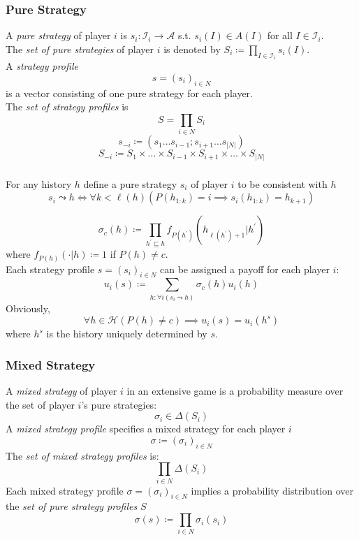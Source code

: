 \documentclass[UTF8,11pt,colorlinks,compress,openany]{beamer}%
\begin{document}
\begin{frame}\frametitle{Pure Strategy}
\begin{definition}
	A \emph{pure strategy} of player $i$ is $s_i: \mathcal{I}_i\to \mathcal{A}$ s.t. $s_i(I)\in A(I)$ for all $I\in\mathcal{I}_i$.\\
	The \emph{set of pure strategies} of player $i$ is denoted by $S_i\coloneqq \prod\limits_{I\in\mathcal{I}_i}s_i(I)$.\\
	A \emph{strategy profile} \[s=(s_i)_{i\in N}\] is a vector consisting of one pure strategy for each player.\\
	The \emph{set of strategy profiles} is \[S=\prod\limits_{i\in N} S_i\]
	\[s_{-i}\coloneqq (s_1\ldots s_{i-1};s_{i+1}\ldots s_{|N|})\]
	\[S_{-i}\coloneqq S_1\times\ldots\times S_{i-1}\times S_{i+1}\times\ldots\times S_{|N|}\]
\end{definition}
\end{frame}

\begin{frame}\frametitle{}
\begin{definition}
	For any history $h$ define a pure strategy $s_i$ of player $i$ to be consistent with $h$
	\[s_i\leadsto h\iff\forall k<\ell(h)\left(P(h_{1:k})=i\implies s_i(h_{1:k})=h_{k+1}\right)\]
\end{definition}
\[\sigma_c(h)\coloneqq \prod\limits_{h^\prime\sqsubseteq h}f_{P(h^\prime)}(h_{\ell(h^\prime)+1}|h^\prime)\]
where $f_{P(h)}(\cdot|h)\coloneqq 1$ if $P(h)\neq c$.\\
Each strategy profile $s=(s_i)_{i\in N}$ can be assigned a payoff for each player $i$:
\[u_i(s)\coloneqq \sum\limits_{h: \forall i(s_i\leadsto h)}\sigma_c(h)u_i(h)\]
Obviously, \[\forall h\in\mathcal{H}\left(P(h)\neq c\right)\implies u_i(s)=u_i(h^s)\] where $h^s$ is the history uniquely determined by $s$.
\end{frame}

\begin{frame}\frametitle{Mixed Strategy}
\setlength\abovedisplayskip{0pt}
\begin{definition}
	A \emph{mixed strategy} of player $i$ in an extensive game is a probability measure over the set of player $i$'s pure strategies:
	\[\sigma_i\in\Delta(S_i)\]
	A \emph{mixed strategy profile} specifies a mixed strategy for each	player $i$
	\[\sigma\coloneqq (\sigma_i)_{i\in N}\]
	The \emph{set of mixed strategy profiles} is:
	\[\prod\limits_{i\in N}\Delta(S_i)\]
	Each mixed strategy profile $\sigma=(\sigma_i)_{i\in N}$ implies a probability distribution
	over the \emph{set of pure strategy profiles} $S$
	\[\sigma(s)\coloneqq \prod\limits_{i\in N} \sigma_i(s_i)\]
\end{definition}
\end{frame}
\end{document}

